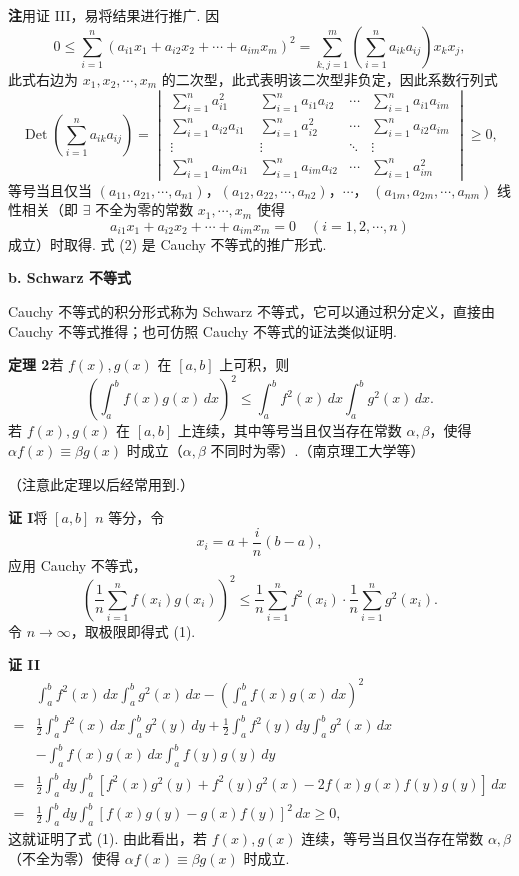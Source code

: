 \documentclass[UTF8,12pt,a4paper,fontset=fandol]{ctexart}
\begin{document}
\noindent\textbf{注}\quad 用证 III，易将结果进行推广. 因
\[
0\le\sum_{i=1}^n(a_{i1}x_1+a_{i2}x_2+\cdots+a_{im}x_m)^2
=\sum_{k,j=1}^m\left(\sum_{i=1}^n a_{ik}a_{ij}\right)x_kx_j,
\]
此式右边为 $x_1,x_2,\cdots,x_m$ 的二次型，此式表明该二次型非负定，因此系数行列式
\[
\operatorname{Det}\left(\sum_{i=1}^n a_{ik}a_{ij}\right)
=
\begin{vmatrix}
\sum_{i=1}^n a_{i1}^2&\sum_{i=1}^n a_{i1}a_{i2}&\cdots&\sum_{i=1}^n a_{i1}a_{im}\\
\sum_{i=1}^n a_{i2}a_{i1}&\sum_{i=1}^n a_{i2}^2&\cdots&\sum_{i=1}^n a_{i2}a_{im}\\
\vdots&\vdots&\ddots&\vdots\\
\sum_{i=1}^n a_{im}a_{i1}&\sum_{i=1}^n a_{im}a_{i2}&\cdots&\sum_{i=1}^n a_{im}^2
\end{vmatrix}\ge0, \tag{2}
\]
等号当且仅当 $(a_{11},a_{21},\cdots,a_{n1})$，$(a_{12},a_{22},\cdots,a_{n2})$，$\cdots$，
$(a_{1m},a_{2m},\cdots,a_{nm})$ 线性相关（即 $\exists$ 不全为零的常数 $x_1,\cdots,x_m$ 使得
\[
a_{i1}x_1+a_{i2}x_2+\cdots+a_{im}x_m=0\quad(i=1,2,\cdots,n)
\]
成立）时取得. 式 (2) 是 Cauchy 不等式的推广形式.

\noindent\textbf{b. Schwarz 不等式}

Cauchy 不等式的积分形式称为 Schwarz 不等式，它可以通过积分定义，直接由 Cauchy 不等式推得；也可仿照 Cauchy 不等式的证法类似证明.

\noindent\textbf{定理 2}\quad 若 $f(x),g(x)$ 在 $[a,b]$ 上可积，则
\[
\left(\int_a^b f(x)g(x)\,dx\right)^2
\le \int_a^b f^2(x)\,dx\int_a^b g^2(x)\,dx. \tag{1}
\]
若 $f(x),g(x)$ 在 $[a,b]$ 上连续，其中等号当且仅当存在常数 $\alpha,\beta$，使得
$\alpha f(x)\equiv\beta g(x)$ 时成立（$\alpha,\beta$ 不同时为零）.（南京理工大学等）

（注意此定理以后经常用到.）

\noindent\textbf{证 I}\quad 将 $[a,b]$ $n$ 等分，令
\[
x_i=a+\frac in(b-a),
\]
应用 Cauchy 不等式，
\[
\left(\frac1n\sum_{i=1}^n f(x_i)g(x_i)\right)^2
\le \frac1n\sum_{i=1}^n f^2(x_i)\cdot \frac1n\sum_{i=1}^n g^2(x_i).
\]
令 $n\to\infty$，取极限即得式 (1).

\noindent\textbf{证 II}\quad
\[
\begin{aligned}
&\int_a^b f^2(x)\,dx\int_a^b g^2(x)\,dx
-\left(\int_a^b f(x)g(x)\,dx\right)^2\\
={}&\frac12\int_a^b f^2(x)\,dx\int_a^b g^2(y)\,dy
+\frac12\int_a^b f^2(y)\,dy\int_a^b g^2(x)\,dx\\
&-\int_a^b f(x)g(x)\,dx\int_a^b f(y)g(y)\,dy\\
={}&\frac12\int_a^b dy\int_a^b
[f^2(x)g^2(y)+f^2(y)g^2(x)-2f(x)g(x)f(y)g(y)]\,dx\\
={}&\frac12\int_a^b dy\int_a^b[f(x)g(y)-g(x)f(y)]^2\,dx\ge0,
\end{aligned}
\]
这就证明了式 (1). 由此看出，若 $f(x),g(x)$ 连续，等号当且仅当存在常数 $\alpha,\beta$（不全为零）使得
$\alpha f(x)\equiv\beta g(x)$ 时成立.
\end{document}
